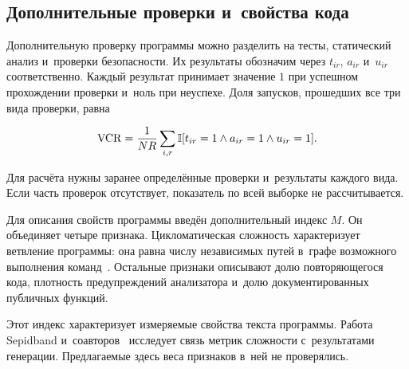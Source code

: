 \subsection{Дополнительные проверки и~свойства кода}
Дополнительную проверку программы можно разделить на тесты, статический анализ и~проверки безопасности. Их результаты обозначим через $t_{ir}$, $a_{ir}$ и~$u_{ir}$ соответственно. Каждый результат принимает значение $1$ при успешном прохождении проверки и~ноль при неуспехе. Доля запусков, прошедших все три вида проверки, равна
\begin{formulakey}
\begin{equation}
\mathrm{VCR}=\frac{1}{NR}\sum_{i,r}\mathbb{I}[t_{ir}=1\land a_{ir}=1\land u_{ir}=1].
\end{equation}
\begin{symbols}
\end{symbols}
\end{formulakey}
Для расчёта нужны заранее определённые проверки и~результаты каждого вида. Если часть проверок отсутствует, показатель по всей выборке не рассчитывается.

Для описания свойств программы введён дополнительный индекс $M$. Он объединяет четыре признака. Цикломатическая сложность характеризует ветвление программы: она равна числу независимых путей в~графе возможного выполнения команд~\cite{mccabe1976}. Остальные признаки описывают долю повторяющегося кода, плотность предупреждений анализатора и~долю документированных публичных функций.

Этот индекс характеризует измеряемые свойства текста программы. Работа Sepidband и~соавторов~\cite{sepidband2025complexity} исследует связь метрик сложности с~результатами генерации. Предлагаемые здесь веса признаков в~ней не проверялись.

